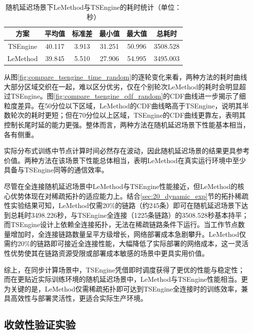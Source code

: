 \documentclass[master, vlined]{DissertUESTC}
\begin{document}
	\begin{table}[!htb]
		\centering
		\caption{随机延迟场景下LeMethod与TSEngine的耗时统计（单位：秒）}
		\label{tab:compare_tsengine_random}
		\begin{tabular}{|c|c|c|c|c|c|}
			\hline
			\textbf{方案} & \textbf{平均值} & \textbf{标准差} & \textbf{最小值} & \textbf{最大值} & \textbf{总耗时} \\
			\hline
			TSEngine & 40.117 & 3.913 & 31.251 & 50.996 & 3508.528 \\
			LeMethod & 39.845 & 5.510 & 27.906 & 54.995 & 3495.003 \\
			\hline
		\end{tabular}
	\end{table}

	从图\ref{fig:compare_tsengine_time_random}的逐轮变化来看，两种方法的耗时曲线大部分区域交织在一起，难以区分优劣，仅在个别轮次LeMethod的耗时会明显超过TSEngine。图\ref{fig:compare_tsengine_cdf_random}的CDF曲线进一步揭示了细粒度差异。在50分位以下区域，LeMethod的CDF曲线略高于TSEngine，说明其半数轮次的耗时更短；但在70分位以上区域，TSEngine的CDF曲线更靠左，表明其控制长尾时延的能力更强。整体而言，两种方法在随机延迟场景下性能基本相当，各有侧重。

	实际分布式训练中节点计算时间必然存在波动，因此随机延迟场景的结果更具参考价值。两种方法在该场景下性能总体相当，表明LeMethod在真实运行环境中至少具备与TSEngine同等的通信效率。

	尽管在全连接随机延迟场景中LeMethod与TSEngine性能接近，但LeMethod的核心优势体现在对稀疏拓扑的适应能力上。结合\ref{sec:20_dynamic_exp}节的拓扑稀疏性实验结果可知，LeMethod仅需20\%的链路（约245条）即可在随机延迟场景下达到总耗时3498.226秒，与TSEngine全连接（1225条链路）的3508.528秒基本持平；而TSEngine设计上依赖全连接拓扑，无法在稀疏链路条件下运行。当工作节点数量增加时，全连接链路数量呈平方级增长，网络部署成本急剧攀升。LeMethod仅需约20\%的链路即可接近全连接性能，大幅降低了实际部署的网络成本，这一灵活性优势使其在链路资源受限或部署成本敏感的场景中更具实用价值。

	综上，在同步计算场景中，TSEngine凭借即时调度获得了更优的性能与稳定性；而在更贴近实际训练环境的随机延迟场景中，LeMethod与TSEngine性能相当。更为关键的是，LeMethod仅需稀疏拓扑即可达到TSEngine全连接时的训练效率，兼具高效性与部署灵活性，更适合实际生产环境。

	\subsection{收敛性验证实验}
	\label{sec:convergence_exp}
\end{document}
